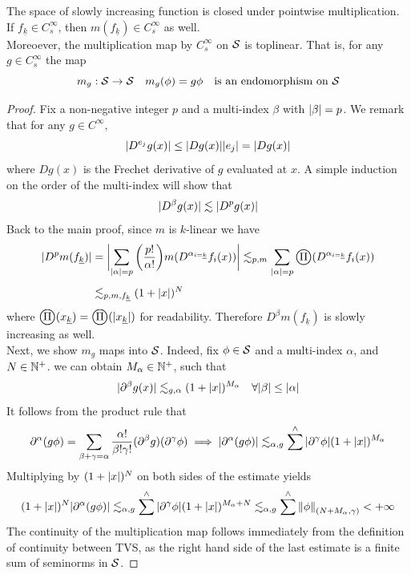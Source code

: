 \documentclass[../main-v2-manifolds.tex]{subfiles}
\begin{document}
\begin{lemma}\label{lem:slowly increasing lemma}
The space of slowly increasing function is closed under pointwise multiplication. If $f_{\underline{k}}\in C_s^\infty$, then $m(f_{\underline{k}})\in C_s^\infty$ as well. \\

Moreoever, the multiplication map by $C_s^\infty$ on $\mathcal{S}$ is toplinear. That is, for any $g\in C_s^\infty$ the map 
\[
m_g: \mathcal{S}\to\mathcal{S} \quad m_g(\phi) = g\phi\quad\text{is an endomorphism on }\mathcal{S}
\]
\end{lemma}
\begin{proof}
    Fix a non-negative integer $p$ and a multi-index $\beta$ with $\vert {\beta} \vert=p$. We remark that for any $g\in C^\infty$, 
    \[
        \vert {D^{e_j} g(x)} \vert\leq \vert {Dg(x)} \vert\vert {e_j} \vert=\vert {Dg(x)} \vert
    \]
    where $Dg(x)$ is the Frechet derivative of $g$ evaluated at $x$. A simple induction on the order of the multi-index will show that 
    \[
        \vert {D^\beta g(x)} \vert\lesssim \vert {D^p g(x)} \vert
    \]
    Back to the main proof, since $m$ is $k$-linear we have
    \begin{align*}
        \abs{D^p m(f_{\underline{k}})} &= \bigabs{\sum_{\abs{\alpha}=p}\qty(\frac{p!}{\alpha!})m(D^{\alpha_{i=\underline{k}}}f_i(x))}\Lsim_{p,m}\sum_{\abs{\alpha}=p}\bigoprod(D^{\alpha_{i=\underline{k}}} f_i(x))\\[1ex]
        &\Lsim_{p,m,f_{{\underline{k}}}} (1+\abs{x})^N
    \end{align*}
    where $\bigoprod(x_{\underline{k}}) = \bigoprod(\vert x_{\underline{k}}\vert)$ for readability. Therefore $D^\beta m(f_{\underline{k}})$ is slowly increasing as well.\\
    
    Next, we show $m_g$ maps into $\mathcal{S}$. Indeed, fix $\phi\in\mathcal{S}$ and a multi-index $\alpha$, and $N\in\mathbb{N}^+$. we can obtain $M_\alpha\in\mathbb{N}^+$, such that
    \[
    \vert {\partial^\beta g(x)} \vert\lesssim_{g,\alpha} (1+\vert {x} \vert)^{M_\alpha}\quad\forall\vert {\beta} \vert\leq\vert {\alpha} \vert
    \]
    It follows from the product rule that
    \[
    \partial^\alpha (g\phi) = \sum_{\beta+\gamma = \alpha}\dfrac{\alpha!}{\beta!\gamma!}(\partial^\beta g)(\partial^\gamma \phi)\implies\vert {\partial^\alpha(g\phi)} \vert\lesssim_{\alpha,g}\sum^{\wedge}\vert {\partial^\gamma\phi} \vert(1+\vert {x} \vert)^{M_{\alpha}}
    \]
    Multiplying by $(1+\vert {x} \vert)^{N}$ on both sides of the estimate yields
    \[
    (1+\vert {x} \vert)^N\vert\partial^\alpha(g\phi)\vert\lesssim_{\alpha,g}\sum^{\wedge}\vert\partial^\gamma\phi\vert(1+\vert {x} \vert)^{M_\alpha + N}\lesssim_{\alpha,g}\sum^{\wedge}\norm{\phi}_{(N+M_\alpha,\gamma)}<+\infty
    \]
    The continuity of the multiplication map follows immediately from the definition of continuity between TVS, as the right hand side of the last estimate is a finite sum of seminorms in $\mathcal{S}$.
    
    
\end{proof}
\end{document}
